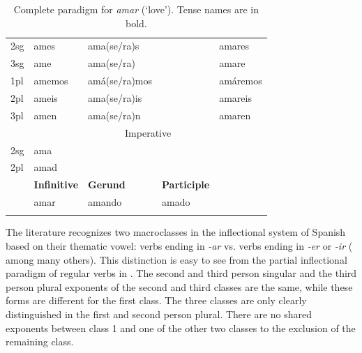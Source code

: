 \begin{table}
\begin{tabular}{lllll}
    2sg & ames                & ama(se/ra)s        &                    & amares          \\
    3sg & ame                 & ama(se/ra)         &                    & amare           \\
    1pl & amemos              & amá(se/ra)mos      &                    & amáremos        \\
    2pl & ameis               & ama(se/ra)is       &                    & amareis         \\
    3pl & amen                & ama(se/ra)n        &                    & amaren          \\
    \midrule
        & \multicolumn{4}{c}{Imperative}                                                  \\
    2sg & ama                                                                             \\
    2pl & amad                                                                            \\
    \midrule
        & \textbf{Infinitive} & \textbf{Gerund}    & \textbf{Participle}                  \\
        & amar                & amando             & amado                                \\
    \lspbottomrule
  \end{tabular}\caption{Complete paradigm for \textit{amar} (`love'). Tense names are in bold.}\label{tab:conj-sp}
\end{table}

The literature recognizes two macroclasses in the inflectional system of Spanish based on their thematic vowel: verbs ending in \textit{-ar} vs. verbs ending in \textit{-er} or \textit{-ir} (\citealt{Aguirre.2008} among many others). This distinction is easy to see from the partial inflectional paradigm of regular verbs in .
The second and third person singular and the third person plural exponents of the second and third classes are the same, while these forms are different for the first class. The three classes are only clearly distinguished in the first and second person plural. There are no shared exponents between class 1 and one of the other two classes to the exclusion of the remaining class.

